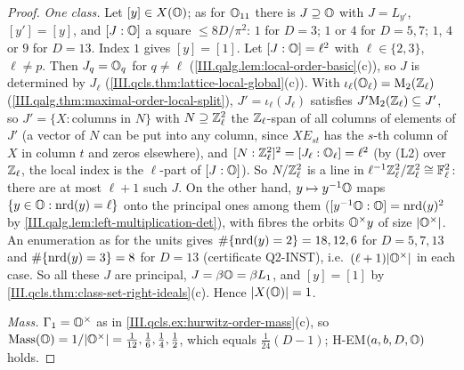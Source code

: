 \begin{proof}
\emph{One class.} Let $[y]\in X(\mathbb{O})$; as for $\mathbb{O}_{11}$ there is $J\supseteq\mathbb{O}$ with $J=L_{y'}$, $[y']=[y]$, and $[J:\mathbb{O}]$ a square $\le8D/\pi^2$:
$1$ for $D=3$; $1$ or $4$ for $D=5,7$; $1$, $4$ or $9$ for $D=13$. Index $1$ gives $[y]=[1]$. Let $[J:\mathbb{O}]=\ell^2$ with $\ell\in\{2,3\}$, $\ell\ne p$. Then
$J_q=\mathbb{O}_q$ for $q\ne\ell$ (\cref{III.qalg.lem:local-order-basic}(c)), so $J$ is determined by $J_\ell$ (\cref{III.qcls.thm:lattice-local-global}(c)). With
$\iota_\ell(\mathbb{O}_\ell)=\mathrm{M}_2(\mathbb{Z}_\ell)$ (\cref{III.qalg.thm:maximal-order-local-split}), $J'=\iota_\ell(J_\ell)$ satisfies $J'\mathrm{M}_2(\mathbb{Z}_\ell)\subseteq J'$, so
$J'=\{X:\text{columns in }N\}$ with $N\supseteq\mathbb{Z}_\ell^2$ the $\mathbb{Z}_\ell$-span of all columns of elements of $J'$ (a vector of $N$ can be put into any column,
since $XE_{st}$ has the $s$-th column of $X$ in column $t$ and zeros elsewhere), and $[N:\mathbb{Z}_\ell^2]^2=[J_\ell:\mathbb{O}_\ell]=\ell^2$ (by (L2) over $\mathbb{Z}_\ell$,
the local index is the $\ell$-part of $[J:\mathbb{O}]$). So $N/\mathbb{Z}_\ell^2$ is a line in $\ell^{-1}\mathbb{Z}_\ell^2/\mathbb{Z}_\ell^2\cong\mathbb F_\ell^2$: there are at most $\ell+1$ such
$J$. On the other hand, $y\mapsto y^{-1}\mathbb{O}$ maps $\{y\in\mathbb{O}:\operatorname{nrd}(y)=\ell\}$ onto the principal ones among them ($[y^{-1}\mathbb{O}:\mathbb{O}]=\operatorname{nrd}(y)^2$ by
\cref{III.qalg.lem:left-multiplication-det}), with fibres the orbits $\mathbb{O}^\times y$ of size $\lvert\mathbb{O}^\times\rvert$. An enumeration as for the units gives
$\#\{\operatorname{nrd}(y)=2\}=18,12,6$ for $D=5,7,13$ and $\#\{\operatorname{nrd}(y)=3\}=8$ for $D=13$ (certificate Q2-INST), i.e.\ $(\ell+1)\lvert\mathbb{O}^\times\rvert$ in each case. So all
these $J$ are principal, $J=\beta\mathbb{O}=\beta L_1$, and $[y]=[1]$ by \cref{III.qcls.thm:class-set-right-ideals}(c). Hence $\lvert X(\mathbb{O})\rvert=1$.

\emph{Mass.} $\Gamma_1=\mathbb{O}^\times$ as in \cref{III.qcls.ex:hurwitz-order-mass}(c), so $\operatorname{Mass}(\mathbb{O})=1/\lvert\mathbb{O}^\times\rvert=\frac1{12},\frac16,\frac14,\frac12$, which
equals $\frac1{24}(D-1)$; H-EM$(a,b,D,\mathbb{O})$ holds.
\end{proof}
